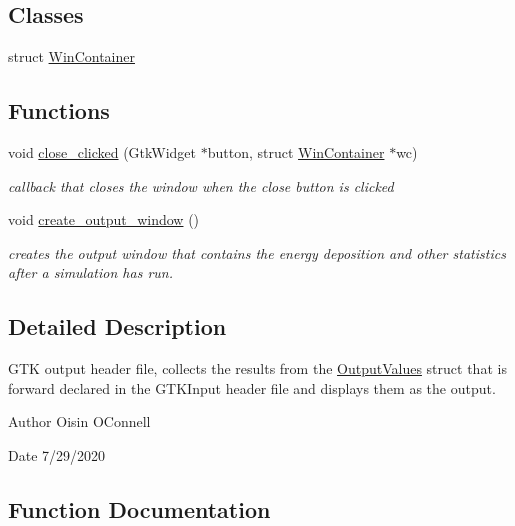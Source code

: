 \subsection*{Classes}
\begin{DoxyCompactItemize}
\item 
struct \hyperlink{structWinContainer}{Win\+Container}
\end{DoxyCompactItemize}
\subsection*{Functions}
\begin{DoxyCompactItemize}
\item 
void \hyperlink{GTKOutput_8hh_acc11cbf62638ba1237401d4346d86a1c}{close\+\_\+clicked} (Gtk\+Widget $\ast$button, struct \hyperlink{structWinContainer}{Win\+Container} $\ast$wc)
\begin{DoxyCompactList}\small\item\em callback that closes the window when the close button is clicked \end{DoxyCompactList}\item 
\mbox{\label{GTKOutput_8hh_a6391991aa8e57c5bdfae21fb4fd8f707}} 
void \hyperlink{GTKOutput_8hh_a6391991aa8e57c5bdfae21fb4fd8f707}{create\+\_\+output\+\_\+window} ()
\begin{DoxyCompactList}\small\item\em creates the output window that contains the energy deposition and other statistics after a simulation has run. \end{DoxyCompactList}\end{DoxyCompactItemize}


\subsection{Detailed Description}
G\+TK output header file, collects the results from the \hyperlink{classOutputValues}{Output\+Values} struct that is forward declared in the G\+T\+K\+Input header file and displays them as the output. 

\begin{DoxyAuthor}{Author}
Oisin O\textquotesingle{}Connell 
\end{DoxyAuthor}
\begin{DoxyDate}{Date}
7/29/2020 
\end{DoxyDate}


\subsection{Function Documentation}
\mbox{\label{GTKOutput_8hh_acc11cbf62638ba1237401d4346d86a1c}} 
